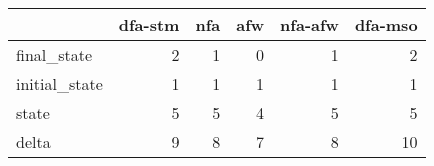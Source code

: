 \begin{tabular}{lrrrrr}
\toprule
{} &  dfa-stm &  nfa &  afw &  nfa-afw &  dfa-mso \\
\midrule
final\_state   &        2 &    1 &    0 &        1 &        2 \\
initial\_state &        1 &    1 &    1 &        1 &        1 \\
state         &        5 &    5 &    4 &        5 &        5 \\
delta         &        9 &    8 &    7 &        8 &       10 \\
\bottomrule
\end{tabular}
